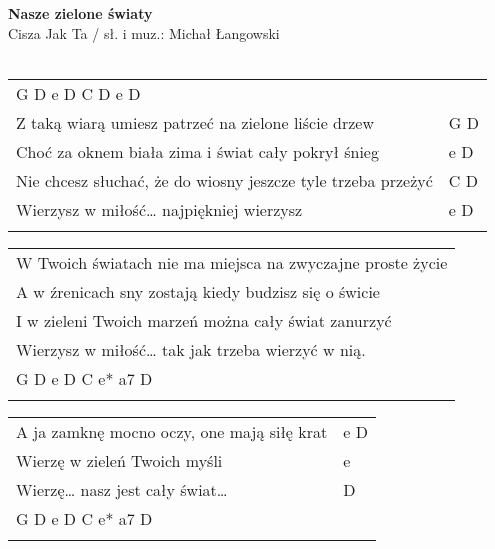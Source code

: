 \documentclass[a5paper]{article}
\begin{document}


\noindent
\fontsize{12pt}{15pt}\selectfont
\textbf{Nasze zielone światy} \\
\fontsize{8pt}{10pt}\selectfont
Cisza Jak Ta / sł. i muz.: Michał Łangowski \\ \\
\fontsize{10pt}{12pt}\selectfont
{}
\begin{tabular}{@{}p{9.50cm}p{3cm}@{}}
\noindent
G D e D C D e D & \\
Z taką wiarą umiesz patrzeć na zielone liście drzew & G D \\
Choć za oknem biała zima i świat cały pokrył śnieg & e D \\
Nie chcesz słuchać, że do wiosny jeszcze tyle trzeba przeżyć & C D \\
Wierzysz w miłość… najpiękniej wierzysz & e D \\ \\
\end{tabular}

\noindent
\begin{tabular}{@{}p{9.50cm}@{}}
W Twoich światach nie ma miejsca na zwyczajne proste życie \\
A w źrenicach sny zostają kiedy budzisz się o świcie \\
I w zieleni Twoich marzeń można cały świat zanurzyć \\
Wierzysz w miłość… tak jak trzeba wierzyć w nią. \\
G D e D C e* a7 D \\ \\
\end{tabular}

\noindent
\begin{tabular}{@{}p{9.50cm}p{3cm}@{}}
A ja zamknę mocno oczy, one mają siłę krat & e D \\
Wierzę w zieleń Twoich myśli & e \\
Wierzę… nasz jest cały świat… & D \\
G D e D C e* a7 D & \\ \\
\end{tabular}
\end{document}
